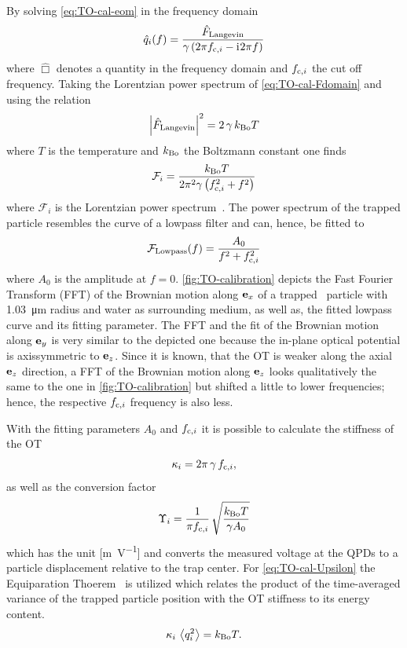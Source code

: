 By solving \cref{eq:TO-cal-eom} in the frequency domain
\begin{equation}
  \hat{q}_{i}(f) = \frac{\hat{F}_{\mathrm{Langevin}}}{\gamma\left( 2\pi f_{\mathrm{c},i} - 
  \mathrm{i}\mkern1mu 2\pi f \right)}
  \label{eq:TO-cal-Fdomain}
\end{equation}
where $\hat{\Box}$ denotes a quantity in the frequency domain and $f_{\mathrm{c},i}$ the 
cut off frequency. Taking the Lorentzian power spectrum of 
\cref{eq:TO-cal-Fdomain} and using the relation
\begin{equation}
  \abs{\hat{F}_{\mathrm{Langevin}}}^{2} = 2\,\gamma\,k_{\mathrm{Bo}}T
\end{equation}
where $T$ is the temperature and $k_{\mathrm{Bo}}$ the Boltzmann constant one finds 
\begin{equation}
  \mathcal{F}_{i}=\frac{k_{\mathrm{Bo}}T}{2\pi^{2}\gamma\left( f_{\mathrm{c},i}^{2}+ f^{2} 
  \right)}
\end{equation}
where $\mathcal{F}_{i}$ is the Lorentzian power spectrum~\cite{Lamprecht2017}. 
The power spectrum of the trapped particle resembles the curve of a lowpass 
filter and can, hence, be fitted to
\begin{equation}
  \mathcal{F}_{\mathrm{Lowpass}}(f) = \frac{A_{0}}{f^{2} + f_{\mathrm{c},i}^{2}}
\end{equation}
where $A_{0}$ is the amplitude at $f=0$. \cref{fig:TO-calibration} depicts the 
Fast Fourier Transform (FFT) of the Brownian motion along $\vb{e}_{x}$ of a trapped 
\SiO~particle with \SI{1.03}{\um} radius and water as surrounding medium, as 
well as, the fitted lowpass curve and its fitting parameter. The FFT and the 
fit of the Brownian motion along $\vb{e}_{y}$ is very similar to the depicted one 
because the in-plane optical potential is axissymmetric to $\vb{e}_{z}$. Since it is 
known, that the OT is weaker along the axial $\vb{e}_{z}$ direction, a FFT of the 
Brownian motion along $\vb{e}_{z}$ looks qualitatively the same to the one in 
\cref{fig:TO-calibration} but shifted a little to lower frequencies; hence, the 
respective $f_{\mathrm{c},i}$ frequency is also less.

With the fitting parameters $A_{0}$ and $f_{\mathrm{c},i}$ it is possible to calculate 
the stiffness of the OT
\begin{equation}
  \kappa_{i} = 2\pi\,\gamma\,f_{\mathrm{c},i},
\end{equation}
as well as the conversion factor
\begin{equation}
  \Upsilon_{i} = \frac{1}{\pi f_{\mathrm{c},i}}\,
  \sqrt{\frac{k_{\mathrm{Bo}}T}{\gamma A_{0}}}
  \label{eq:TO-cal-Upsilon}
\end{equation}
which has the unit [\si{\meter\per\volt}] and converts the measured voltage at 
the QPDs to a particle displacement relative to the trap center. For 
\cref{eq:TO-cal-Upsilon} the Equiparation Thoerem~\cite{Wang1945} is utilized 
which relates the product of the time-averaged variance of the trapped particle 
position with the OT stiffness to its energy content.
\begin{equation}
  \kappa_{i}\,\left\langle q_{i}^{2} \right\rangle = k_{\mathrm{Bo}}T.
\end{equation}



